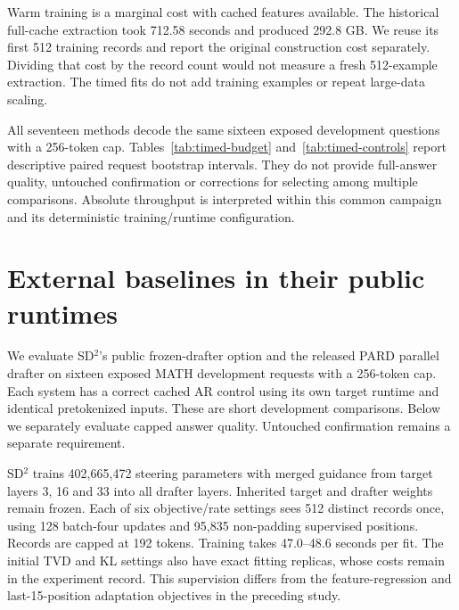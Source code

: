 \documentclass{article}
\begin{document}
Warm training is a marginal cost with cached features available. The
historical full-cache extraction took 712.58 seconds and produced
292.8 GB. We reuse its first 512 training records and report the original
construction cost separately. Dividing that cost by the record count
would not measure a fresh 512-example extraction. The timed fits do not
add training examples or repeat large-data scaling.

All seventeen methods decode the same sixteen exposed development
questions with a 256-token cap. Tables~\ref{tab:timed-budget}
and~\ref{tab:timed-controls} report descriptive paired request bootstrap
intervals. They do not provide full-answer quality, untouched confirmation
or corrections for selecting among multiple comparisons. Absolute
throughput is interpreted within this common campaign and its deterministic
training/runtime configuration.

\clearpage
\section{External baselines in their public runtimes}
\label{app:externalbaselines}

We evaluate SD$^2$'s public frozen-drafter option and the released PARD
parallel drafter on sixteen exposed MATH development requests with a
256-token cap. Each system has a correct cached AR control using its
own target runtime and identical pretokenized inputs. These are short
development comparisons. Below we separately evaluate capped answer
quality. Untouched confirmation remains a separate requirement.

SD$^2$ trains 402,665,472 steering parameters with merged guidance from
target layers 3, 16 and 33 into all drafter layers. Inherited target and
drafter weights remain frozen. Each of six objective/rate settings sees
512 distinct records once, using 128 batch-four updates and 95,835
non-padding supervised positions. Records are capped at 192 tokens.
Training takes 47.0--48.6 seconds per fit. The initial TVD and KL settings
also have exact fitting replicas, whose costs remain in the experiment
record. This supervision differs from the feature-regression and
last-15-position adaptation objectives in the preceding study.

\begin{table}[H]
\caption{One-epoch SD$^2$ development comparison. Intervals resample
paired requests 10,000 times and do not adjust for rate selection.
Exact AR counts identical capped token sequences.}
\label{tab:sd-square-development}
\centering\footnotesize
\setlength{\tabcolsep}{3pt}

\end{table}
\end{document}
